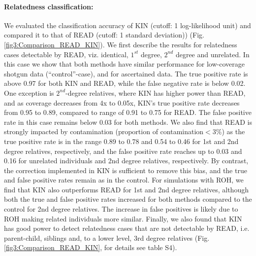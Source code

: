 \documentclass[12pt, letterpaper]{article}
\begin{document}
\paragraph{Relatedness classification:}
We evaluated the classification accuracy of KIN (cutoff: 1 log-likelihood unit) and compared it to that of READ (cutoff: 1 standard deviation)) (Fig. \ref{fig3:Comparison_READ_KIN}). We first describe the results for relatedness cases detectable by READ, viz. identical, $1^{st}$ degree, $2^{nd}$ degree and unrelated. In this case we show that both methods have similar performance for low-coverage shotgun data (``control''-case), and for ascertained data. The true positive rate is above 0.97 for both KIN and READ, while the false negative rate is below 0.02. One exception is  $2^{nd}$-degree relatives, where KIN has higher power than READ, and as coverage decreases from 4x to 0.05x, KIN's true positive rate decreases from 0.95 to 0.89, compared to range of 0.91 to 0.75 for READ. The false positive rate in this case remains below 0.03 for both methods. We also find that READ is strongly impacted by contamination (proportion of contamination$<3\%$) as the true positive rate is in the range 0.89 to 0.78 and 0.54 to 0.46 for 1st and 2nd degree relatives, respectively, and the false positive rate reaches up to 0.03 and 0.16 for unrelated individuals and 2nd degree relatives, respectively. By contrast, the correction implemented in KIN is sufficient to remove this bias, and the true and false positive rates remain as in the control. For simulations with ROH, we find that KIN also outperforms READ for 1st and 2nd degree relatives, although both the true and false positive rates increased for both methods compared to the control for 2nd degree relatives. The increase in false positives is likely due to ROH making related individuals more similar. Finally, we also found that KIN has good power to detect relatedness cases that are not detectable by READ, i.e. parent-child, siblings and, to a lower level, 3rd degree relatives (Fig. \ref{fig3:Comparison_READ_KIN}, for details see table S4).
\end{document}
